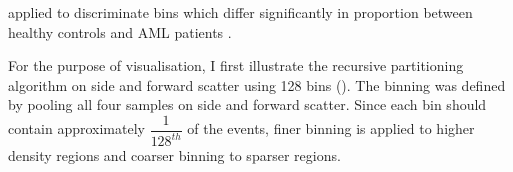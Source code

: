 applied to discriminate bins which differ significantly in proportion between healthy controls and \gls{AML} patients
\citep{Rogers:2008ij,Rogers:2009jz}.


For the purpose of visualisation, I first illustrate the recursive partitioning algorithm on side and forward scatter using 128 bins ().
The binning was defined by pooling all four samples on side and forward scatter.
Since each bin should contain approximately $\dfrac{1}{128^{th}}$ of the events, finer binning is applied to higher density regions and coarser binning to sparser regions.

